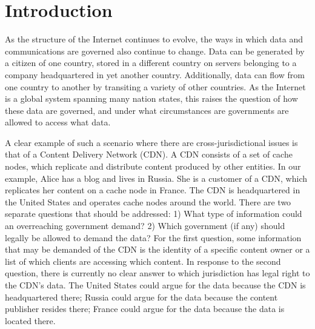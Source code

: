 \section{Introduction}
\label{sec:intro}

As the structure of the Internet continues to evolve, the ways in which 
data and communications are governed also continue to change.  Data can 
be generated by a citizen of one country, stored in a different country 
on servers belonging to a company headquartered in yet another country.  
Additionally, data can flow from one country to another by transiting a 
variety of other countries.  As the Internet is a global system spanning 
many nation states, this raises the question of how these data are 
governed, and under what circumstances are governments are allowed to access what
data.


A clear example of such a scenario where there are cross-jurisdictional issues is that of 
a Content Delivery Network (CDN).  A CDN consists of a set of cache nodes, which replicate 
and distribute content produced by other entities.  In our example, Alice has a blog and lives in Russia.  
She is a customer of a CDN, which replicates her 
content on a cache node in France.  The CDN is headquartered 
in the United States and operates cache nodes around the world.  There are two separate questions that should 
be addressed: 1) What type of information could an overreaching government demand? 2) Which government 
(if any) should legally be allowed to demand the data?  For the first question, some information that may be 
demanded of the CDN is the identity of a specific content owner or a list of which clients are accessing which content. 
In response to the second question, there is currently no clear answer to which jurisdiction has legal 
right to the CDN's data.  The United States could argue for the data because the CDN is headquartered 
there; Russia could argue for the data because the content publisher resides there; France could argue for the data 
because the data is located there. 

